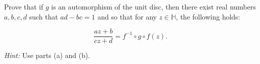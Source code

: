 Prove that if $g$ is an automorphism of the unit disc, then there exist real numbers $a, b, c, d$ such that 
$ad - bc = 1$ and so that for any $z \in \mathbb{H}$, the following holds:

$$
\frac{az + b}{cz + d} = f^{-1} \circ g \circ f(z).
$$

\textit{Hint: } Use parts (a) and (b).

\begin{solution}
  \ \\
\end{solution}